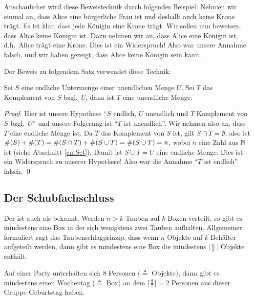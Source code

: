 Anschaulicher wird diese Beweistechnik durch folgendes Beispiel:
Nehmen wir einmal an, dass Alice eine bürgerliche Frau ist und deshalb
auch keine Krone trägt. Es ist klar, dass jede Königin eine Krone
trägt. Wir sollen nun beweisen, dass Alice keine Königin ist. Dazu
nehmen wir an, dass Alice eine Königin ist, d.h.~Alice trägt eine
Krone. Dies ist ein Widerspruch! Also war unsere Annahme falsch, und
wir haben gezeigt, dass Alice keine Königin sein kann.

\bigskip
\goodbreak
\noindent Der Beweis zu folgendem Satz verwendet diese Technik:
\begin{theorem}
Sei $S$ eine endliche Untermenge einer unendlichen Menge $U$. Sei $T$
das Komplement von $S$ bzgl.~$U$, dann ist $T$ eine unendliche Menge.
\end{theorem}

\begin{proof}
Hier ist unsere Hypothese "`$S$ endlich, $U$ unendlich und $T$
Komplement von $S$ bzgl.~$U$"' und unsere Folgerung ist "`$T$ ist
unendlich"'. Wir nehmen also an, dass $T$ eine endliche Menge ist. Da
$T$ das Komplement von $S$ ist, gilt $S \cap T = \emptyset$, also ist
$\#(S) + \#(T) = \# (S \cap T) + \# (S \cup T) = \# (S \cup
T) = n$, wobei $n$ eine Zahl aus $\mathbb N$ ist (siehe
Abschnitt \ref{cntSet}). Damit ist $S \cup T = U$ eine endliche
Menge. Dies ist ein Widerspruch zu unserer Hypothese! Also war die
Annahme "`$T$ ist endlich"' falsch. \qed
\end{proof}

\subsection{Der Schubfachschluss}
\label{Schubfachschluss}
Der  ist auch 
als  
bekannt. Werden $n > k$ Tauben auf $k$ Boxen verteilt, so gibt es 
mindestens eine Box in der sich wenigstens zwei Tauben aufhalten. 
Allgemeiner formuliert sagt das Taubenschlagprinzip, dass wenn $n$ 
Objekte auf $k$ Behälter aufgeteilt werden, dann gibt es mindestens 
eine Box die mindestens $\lceil \frac{n}{k} \rceil$ Objekte enthält.

\begin{example}
Auf einer Party unterhalten sich $8$ Personen ($\triangleq$ Objekte),
dann gibt es mindestens einen Wochentag ($\triangleq$ Box) an dem
$\lceil \frac{8}{7} \rceil =2$ Personen aus dieser Gruppe Geburtstag
haben.
\end{example}

